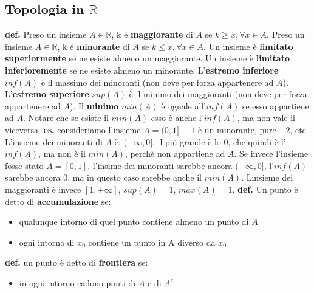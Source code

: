 \subsection*{Topologia in $\mathbb{R}$}
\textbf{def.}
\newline
Preso un insieme $A\in \mathbb{R}$, k é \textbf{maggiorante} di $A$ se $k\geq x, \forall x \in A$.
\newline
Preso un insieme $A\in \mathbb{R}$, k é \textbf{minorante} di $A$ se $k\leq x, \forall x \in A$.
\newline
Un insieme è \textbf{limitato superiormente} se ne esiste almeno un maggiorante.
\newline
Un insieme è \textbf{limitato inferioremente} se ne esiste almeno un minorante.
\newline
L'\textbf{estremo inferiore} $inf(A)$ è il massimo dei minoranti (non deve per forza appartenere ad $A$).
\newline
L'\textbf{estremo superiore} $sup(A)$ è il minimo dei maggioranti (non deve per forza appartenere ad $A$).
\newline
Il \textbf{minimo} $min(A)$ è uguale all'$inf(A)$ se esso appartiene ad $A$. Notare che se esiste il $min(A)$ esso è anche l'$inf(A)$, ma non vale il viceversa.
\newline
\newline
\textbf{es.} consideriamo l'insieme $A=(0,1]$.
\newline
$-1$ è un minorante, pure $-2$, etc. L'insieme dei minoranti di $A$ è: $(-\infty,0]$, il più grande è lo $0$, che quindi è l'$inf(A)$, ma non è il $min(A)$, perchè non appartiene ad $A$.
\newline
Se invece l'insieme fosse stato $A=[0,1]$, l'insime dei minoranti sarebbe ancora $(-\infty,0]$, l'$inf(A)$ sarebbe ancora $0$, ma in questo caso sarebbe anche il $min(A)$.
\newline
Linsieme dei maggioranti è invece $[1,+\infty]$, $sup(A)=1$, $max(A)=1$.
\newline
\newline
\textbf{def.} Un punto è detto di \textbf{accumulazione} se:
\begin{itemize}
    \item qualunque intorno di quel punto contiene almeno un punto di $A$
    \item ogni intorno di $x_0$ contiene un punto in A diverso da $x_0$
\end{itemize}
\textbf{def.} un punto è detto di \textbf{frontiera} se:
\begin{itemize}
    \item in ogni intorno cadono punti di $A$ e di $A^c$
\end{itemize}
